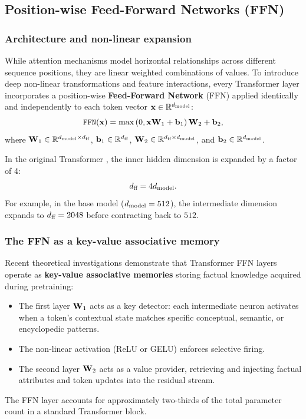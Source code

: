 \documentclass[../../main.tex]{subfiles}
\begin{document}
\subsection{Position-wise Feed-Forward Networks (FFN)}
\label{subsec:ffn_deep}

\subsubsection{Architecture and non-linear expansion}
While attention mechanisms model horizontal relationships across different sequence positions, they are linear weighted combinations of values. To introduce deep non-linear transformations and feature interactions, every Transformer layer incorporates a position-wise \textbf{Feed-Forward Network} (FFN) applied identically and independently to each token vector $\mathbf{x} \in \mathbb{R}^{d_{\text{model}}}$:
\begin{equation}
\label{eq:position_wise_ffn_ch5}
\text{\texttt{FFN}}(\mathbf{x}) = \max\left(0, \mathbf{x} \mathbf{W}_1 + \mathbf{b}_1\right) \mathbf{W}_2 + \mathbf{b}_2,
\end{equation}
where $\mathbf{W}_1 \in \mathbb{R}^{d_{\text{model}} \times d_{\text{ff}}}$, $\mathbf{b}_1 \in \mathbb{R}^{d_{\text{ff}}}$, $\mathbf{W}_2 \in \mathbb{R}^{d_{\text{ff}} \times d_{\text{model}}}$, and $\mathbf{b}_2 \in \mathbb{R}^{d_{\text{model}}}$.

In the original Transformer \cite{vaswani2017}, the inner hidden dimension is expanded by a factor of 4:
\begin{equation}
d_{\text{ff}} = 4 d_{\text{model}}.
\end{equation}
For example, in the base model ($d_{\text{model}} = 512$), the intermediate dimension expands to $d_{\text{ff}} = 2048$ before contracting back to $512$.

\subsubsection{The FFN as a key-value associative memory}
Recent theoretical investigations \cite{geva2021} demonstrate that Transformer FFN layers operate as \textbf{key-value associative memories} storing factual knowledge acquired during pretraining:
\begin{itemize}
    \item The first layer $\mathbf{W}_1$ acts as a key detector: each intermediate neuron activates when a token's contextual state matches specific conceptual, semantic, or encyclopedic patterns.
    \item The non-linear activation (ReLU or GELU) enforces selective firing.
    \item The second layer $\mathbf{W}_2$ acts as a value provider, retrieving and injecting factual attributes and token updates into the residual stream.
\end{itemize}
The FFN layer accounts for approximately two-thirds of the total parameter count in a standard Transformer block.
\end{document}

